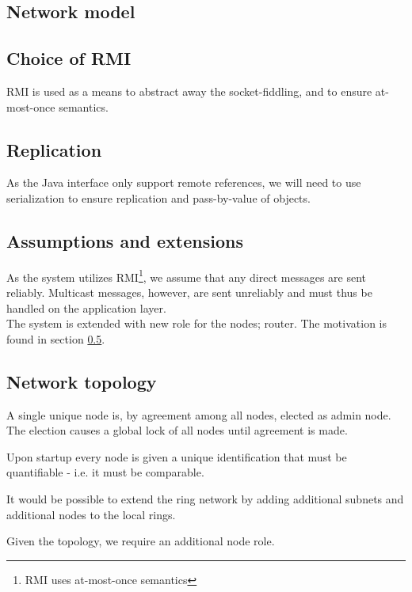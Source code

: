 \documentclass[10pt,a4paper]{article}
\begin{document}
\subsection{Network model}

\subsection{Choice of RMI}
RMI is used as a means to abstract away the socket-fiddling, and to ensure at-most-once semantics.

\subsection{Replication}
As the Java interface  only support remote references, we will need to use serialization to ensure replication and pass-by-value of objects.

\subsection{Assumptions and extensions}
As the system utilizes RMI\footnote{RMI uses at-most-once semantics}, we assume that any direct messages are sent reliably. Multicast messages, however, are sent unreliably and must thus be handled on the application layer.\\

The system is extended with new role for the nodes; router. The motivation is found in section \ref{network_topology}.

\subsection{Network topology}
\label{network_topology}
A single unique node is, by agreement among all nodes, elected as admin node. The election causes a global lock of all nodes until agreement is made.

Upon startup every node is given a unique identification that must be quantifiable - i.e. it must be comparable.

It would be possible to extend the ring network by adding additional subnets and additional nodes to the local rings.

Given the topology, we require an additional node role.
\end{document}
